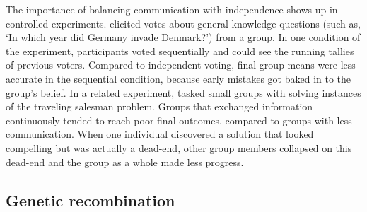 \documentclass[12pt]{article}
\begin{document}
The importance of balancing communication with independence shows up in controlled experiments. \cite{frey2021social} elicited votes about general knowledge questions (such as, `In which year did Germany invade Denmark?') from a group. In one condition of the experiment, participants voted sequentially and could see the running tallies of previous voters. Compared to independent voting, final group means were less accurate in the sequential condition, because early mistakes got baked in to the group's belief. In a related experiment, \cite{bernstein2018intermittent} tasked small groups with solving instances of the traveling salesman problem. Groups that exchanged information continuously tended to reach poor final outcomes, compared to groups with less communication. When one individual discovered a solution that looked compelling but was actually a dead-end, other group members collapsed on this dead-end and the group as a whole made less progress. 








\subsection{Genetic recombination}
\end{document}
